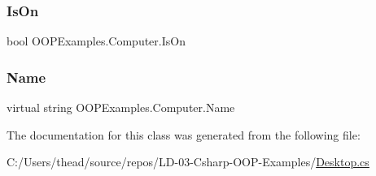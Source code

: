 \subsubsection{\texorpdfstring{Is\+On}{IsOn}}
{\footnotesize\ttfamily bool O\+O\+P\+Examples.\+Computer.\+Is\+On\hspace{0.3cm}{\ttfamily [get]}}

\mbox{\label{class_o_o_p_examples_1_1_computer_af43574d61dd28bd460eeeec609f03ae6}} 
\subsubsection{\texorpdfstring{Name}{Name}}
{\footnotesize\ttfamily virtual string O\+O\+P\+Examples.\+Computer.\+Name\hspace{0.3cm}{\ttfamily [get]}}



The documentation for this class was generated from the following file\+:\begin{DoxyCompactItemize}
\item 
C\+:/\+Users/thead/source/repos/\+L\+D-\/03-\/\+Csharp-\/\+O\+O\+P-\/\+Examples/\mbox{\hyperlink{_desktop_8cs}{Desktop.\+cs}}\end{DoxyCompactItemize}
